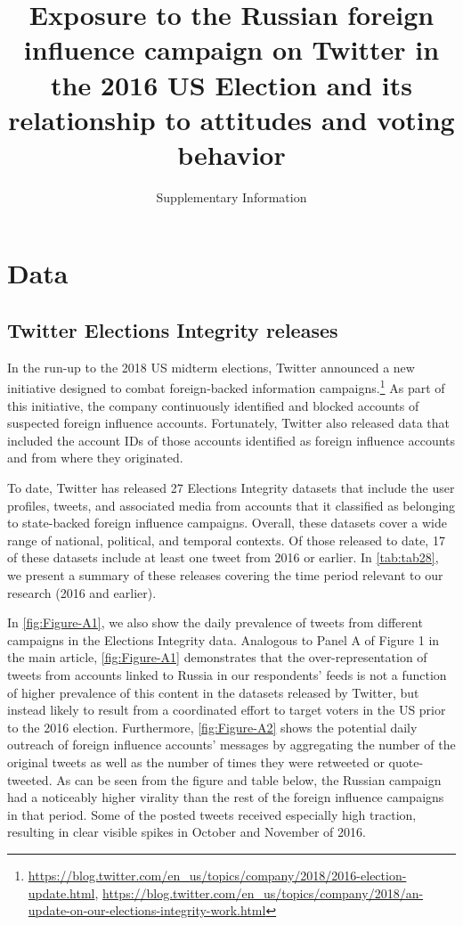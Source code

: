 \documentclass[
  12pt,
]{article}
\title{\Large \textbf{Exposure to the Russian foreign influence campaign on Twitter in the 2016 US Election and its relationship to attitudes and voting behavior}\vspace{2mm}}
\subtitle{\Large Supplementary Information}
\author{}
\date{\vspace{-2.5em}}
\begin{document}
\maketitle

{
\hypersetup{linkcolor=}
\setcounter{tocdepth}{2}
\tableofcontents
}
\clearpage

\hypertarget{data}{%
\section{Data}\label{data}}

\hypertarget{twitter-elections-integrity-releases}{%
\subsection{Twitter Elections Integrity releases}\label{twitter-elections-integrity-releases}}

In the run-up to the 2018 US midterm elections, Twitter announced a new initiative designed to combat foreign-backed information campaigns.\footnote{\url{https://blog.twitter.com/en_us/topics/company/2018/2016-election-update.html}, \url{https://blog.twitter.com/en_us/topics/company/2018/an-update-on-our-elections-integrity-work.html}} As part of this initiative, the company continuously identified and blocked accounts of suspected foreign influence accounts. Fortunately, Twitter also released data that included the account IDs of those accounts identified as foreign influence accounts and from where they originated.

To date, Twitter has released 27 Elections Integrity datasets that include the user profiles, tweets, and associated media from accounts that it classified as belonging to state-backed foreign influence campaigns. Overall, these datasets cover a wide range of national, political, and temporal contexts. Of those released to date, 17 of these datasets include at least one tweet from 2016 or earlier. In \autoref{tab:tab28}, we present a summary of these releases covering the time period relevant to our research (2016 and earlier).

In \autoref{fig:Figure-A1}, we also show the daily prevalence of tweets from different campaigns in the Elections Integrity data. Analogous to Panel A of Figure 1 in the main article, \autoref{fig:Figure-A1} demonstrates that the over-representation of tweets from accounts linked to Russia in our respondents' feeds is not a function of higher prevalence of this content in the datasets released by Twitter, but instead likely to result from a coordinated effort to target voters in the US prior to the 2016 election. Furthermore, \autoref{fig:Figure-A2} shows the potential daily outreach of foreign influence accounts' messages by aggregating the number of the original tweets as well as the number of times they were retweeted or quote-tweeted. As can be seen from the figure and table below, the Russian campaign had a noticeably higher virality than the rest of the foreign influence campaigns in that period. Some of the posted tweets received especially high traction, resulting in clear visible spikes in October and November of 2016.
\end{document}
